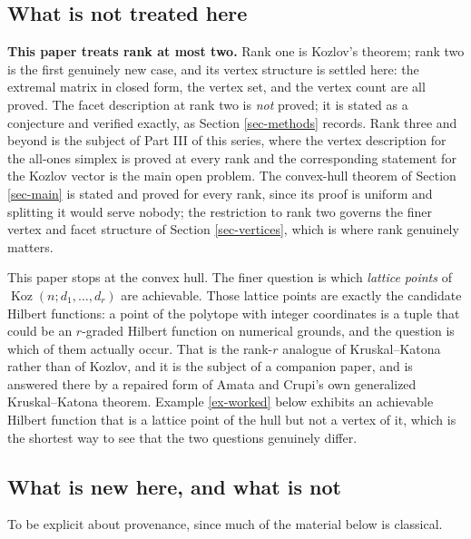 \documentclass[11pt, a4paper, abstract=yes]{scrartcl}
\theoremstyle{definition}
\theoremstyle{remark}
\theoremstyle{plain}
\newcommand{\Koz}{\operatorname{Koz}}
\begin{document}
\subsection{What is not treated here}
\label{sec-scope}
\textbf{This paper treats rank at most two.} Rank one is Kozlov's theorem; rank two is the first genuinely
new case, and its vertex structure is settled here: the extremal matrix in closed form, the vertex
set, and the vertex count are all proved. The facet description at rank two is \emph{not} proved; it is
stated as a conjecture and verified exactly, as Section \ref{sec-methods} records. Rank three and beyond is the subject of
Part III of this series, where the vertex description for the all-ones simplex is proved at every
rank and the corresponding statement for the Kozlov vector is the main open problem. The convex-hull
theorem of Section \ref{sec-main} is stated and proved for every rank, since its proof is uniform and
splitting it would serve nobody; the restriction to rank two governs the finer vertex and facet
structure of Section \ref{sec-vertices}, which is where rank genuinely matters.


This paper stops at the convex hull. The finer question is which \emph{lattice points} of
\(\Koz(n;d_1,\dots,d_r)\) are achievable. Those lattice points are exactly the candidate Hilbert
functions: a point of the polytope with integer coordinates is a tuple that could be an
\(r\)-graded Hilbert function on numerical grounds, and the question is which of them actually
occur. That is the rank-\(r\) analogue of Kruskal--Katona rather than of Kozlov, and it is the
subject of a companion paper, and is answered there by a repaired form of Amata and
Crupi's own generalized Kruskal--Katona theorem. Example \ref{ex-worked} below exhibits an achievable
Hilbert function that is a lattice point of the hull but not a vertex of it, which is the shortest
way to see that the two questions genuinely differ.
\subsection{What is new here, and what is not}
\label{sec:org1bd30b4}

To be explicit about provenance, since much of the material below is classical.
\end{document}
